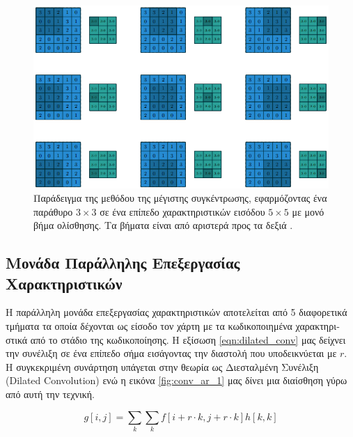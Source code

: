 \begin{figure}[H]
 \centering
 \includegraphics[scale=0.5]{Images/maxpool}
  \caption[\textgreek{Παράδειγμα Μέγιστη Συγκέντρωσης}]{\textgreek{Παράδειγμα της μεθόδου της μέγιστης συγκέντρωσης, εφαρμόζοντας ένα παράθυρο $3\times3$ σε ένα επίπεδο χαρακτηριστικών εισόδου $5\times5$ με μονό βήμα ολίσθησης. Τα βήματα είναι από αριστερά προς τα δεξιά} \cite{conv_arithmetic}.}
 \label{fig:maxpool}
\end{figure}

\subsection{\textgreek{Μονάδα Παράλληλης Επεξεργασίας Χαρακτηριστικών}}
\textgreek{Η παράλληλη μονάδα επεξεργασίας χαρακτηριστικών αποτελείται από 5 διαφορετικά τμήματα τα οποία δέχονται ως είσοδο τον χάρτη με τα κωδικοποιημένα χαρακτηριστικά από το στάδιο της κωδικοποίησης. Η εξίσωση }\ref{eqn:dilated_conv} \textgreek{μας δείχνει την συνέλιξη σε ένα επίπεδο σήμα εισάγοντας την διαστολή που υποδεικνύεται με $r$}.\textgreek{ Η συγκεκριμένη συνάρτηση υπάγεται στην θεωρία ως Διεσταλμένη Συνέλιξη} (Dilated Convolution) \textgreek{ενώ η εικόνα }\ref{fig:conv_ar_1} \textgreek{ μας δίνει μια διαίσθηση γύρω από αυτή την τεχνική.}

\begin{equation}
  \label{eqn:dilated_conv}
  g[i,j] = \sum_{k}\sum_{k} f[i+r\cdot k, j+r\cdot k]h[k,k] 
\end{equation}


